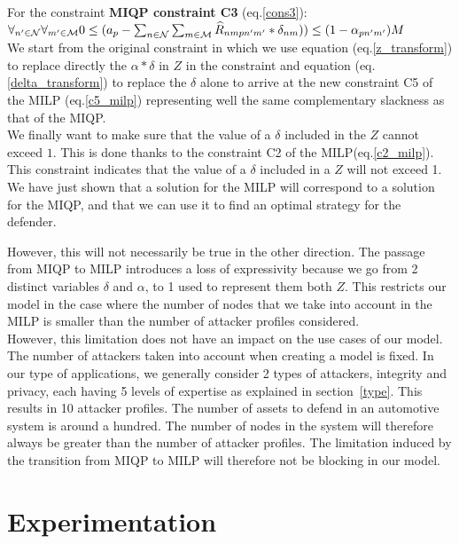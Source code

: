 For the constraint \textbf{MIQP constraint C3} (eq.\ref{cons3}): $\forall_{n' \in \mathcal{N}}  \forall_{m' \in \mathcal{M}} 0 \leq (a_p - \sum_{n \in \mathcal{N}} \sum_{m \in \mathcal{M}} \\\widehat{R}_{nmpn'm'} * \delta_{nm} ))   \leq (1 - \alpha_{pn'm'} ) M$ \\
We start from the original constraint in which we use equation (eq.\ref{z_transform}) to replace directly the $\alpha*\delta$ in $Z$ in the constraint and equation (eq.\ref{delta_transform}) to replace the $\delta$ alone to arrive at the new constraint C5 of the MILP (eq.\ref{c5_milp}) representing well the same complementary slackness as that of the MIQP. \\

We finally want to make sure that the value of a $\delta$ included in the $Z$ cannot exceed $1$. This is done thanks to the constraint C2 of the MILP(eq.\ref{c2_milp}). This constraint indicates that the value of a $\delta$ included in a $Z$ will not exceed 1. \\

We have just shown that a solution for the MILP will correspond to a solution for the MIQP, and that we can use it to find an optimal strategy for the defender.

However, this will not necessarily be true in the other direction. The passage from MIQP to MILP introduces a loss of expressivity because we go from 2 distinct variables $\delta$ and $\alpha$, to 1 used to represent them both $Z$. This restricts our model in the case where the number of nodes that we take into account in the MILP is smaller than the number of attacker profiles considered. \\

However, this limitation does not have an impact on the use cases of our model. The number of attackers taken into account when creating a model is fixed. In our type of applications, we generally consider 2 types of attackers, integrity and privacy, each having 5 levels of expertise as explained in section~\ref{type}. This results in 10 attacker profiles. The number of assets to defend in an automotive system is around a hundred. The number of nodes in the system will therefore always be greater than the number of attacker profiles. The limitation induced by the transition from MIQP to MILP will therefore not be blocking in our model.



\section {Experimentation}

